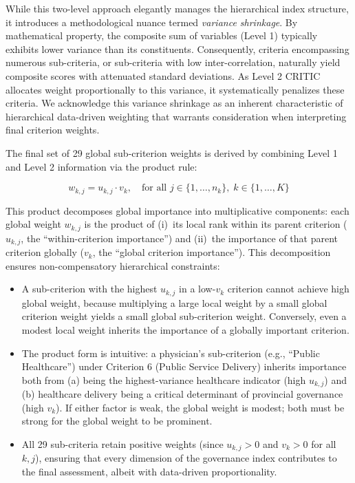 \documentclass[12pt,a4paper]{article}
\begin{document}
While this two-level approach elegantly manages the hierarchical index structure, it introduces a methodological nuance termed \emph{variance shrinkage}. By mathematical property, the composite sum of variables (Level 1) typically exhibits lower variance than its constituents. Consequently, criteria encompassing numerous sub-criteria, or sub-criteria with low inter-correlation, naturally yield composite scores with attenuated standard deviations. As Level 2 CRITIC allocates weight proportionally to this variance, it systematically penalizes these criteria. We acknowledge this variance shrinkage as an inherent characteristic of hierarchical data-driven weighting that warrants consideration when interpreting final criterion weights.

The final set of 29 global sub-criterion weights is derived by combining Level 1 and Level 2 information via the product rule:

\begin{equation}
\label{eq:global_weights}
w_{k,j} = u_{k,j} \cdot v_k, \quad
\text{for all } j \in \{1,\ldots,n_k\},\; k \in \{1,\ldots,K\}
\end{equation}

This product decomposes global importance into multiplicative components: each global weight $w_{k,j}$ is the product of (i)~its local rank within its parent criterion ($u_{k,j}$, the ``within-criterion importance'') and (ii)~the importance of that parent criterion globally ($v_k$, the ``global criterion importance''). This decomposition ensures non-compensatory hierarchical constraints:

\begin{itemize}[itemsep=3pt]
  \item A sub-criterion with the highest $u_{k,j}$ in a low-$v_k$ criterion cannot achieve high global weight, because multiplying a large local weight by a small global criterion weight yields a small global sub-criterion weight. Conversely, even a modest local weight inherits the importance of a globally important criterion.
  
  \item The product form is intuitive: a physician's sub-criterion (e.g., ``Public Healthcare'') under Criterion 6 (Public Service Delivery) inherits importance both from (a) being the highest-variance healthcare indicator (high $u_{k,j}$) and (b) healthcare delivery being a critical determinant of provincial governance (high $v_k$). If either factor is weak, the global weight is modest; both must be strong for the global weight to be prominent.
  
  \item All 29 sub-criteria retain positive weights (since $u_{k,j} > 0$ and $v_k > 0$ for all $k, j$), ensuring that every dimension of the governance index contributes to the final assessment, albeit with data-driven proportionality.
\end{itemize}
\end{document}
